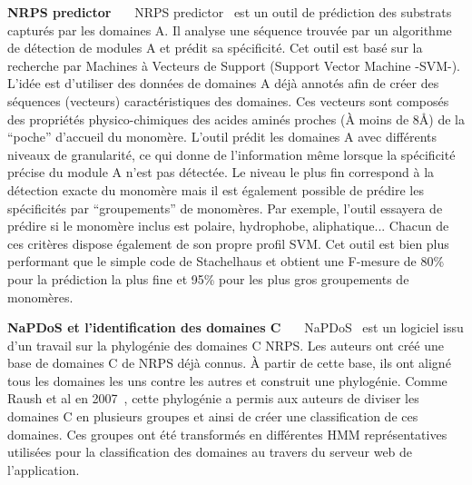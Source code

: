 \textbf{NRPS predictor}~~~
NRPS predictor~\cite{rottig_nrpspredictor2web_2011,rausch_specificity_2005} est un outil de prédiction des substrats capturés par les domaines A.
Il analyse une séquence trouvée par un algorithme de détection de modules A et prédit sa spécificité.
Cet outil est basé sur la recherche par Machines à Vecteurs de Support (Support Vector Machine -SVM-).
L'idée est d'utiliser des données de domaines A déjà annotés afin de créer des séquences (vecteurs) caractéristiques des domaines.
Ces vecteurs sont composés des propriétés physico-chimiques des acides aminés proches (À moins de 8Å) de la ``poche'' d'accueil du monomère.
L'outil prédit les domaines A avec différents niveaux de granularité, ce qui donne de l'information même lorsque la spécificité précise du module A n'est pas détectée.
Le niveau le plus fin correspond à la détection exacte du monomère mais il est également possible de prédire les spécificités par ``groupements'' de monomères.
Par exemple, l'outil essayera de prédire si le monomère inclus est polaire, hydrophobe, aliphatique...
Chacun de ces critères dispose également de son propre profil SVM.
Cet outil est bien plus performant que le simple code de Stachelhaus et obtient une F-mesure de 80\% pour la prédiction la plus fine et 95\% pour les plus gros groupements de monomères.


\textbf{NaPDoS et l'identification des domaines C}~~~
NaPDoS~\cite{ziemert_natural_2012} est un logiciel issu d'un travail sur la phylogénie des domaines C NRPS.
Les auteurs ont créé une base de domaines C de NRPS déjà connus.
À partir de cette base, ils ont aligné tous les domaines les uns contre les autres et construit une phylogénie.
Comme Raush et al en 2007~\cite{rausch_phylogenetic_2007}, cette phylogénie a permis aux auteurs de diviser les domaines C en plusieurs groupes et ainsi de créer une classification de ces domaines.
Ces groupes ont été transformés en différentes HMM représentatives utilisées pour la classification des domaines au travers du serveur web de l'application.



